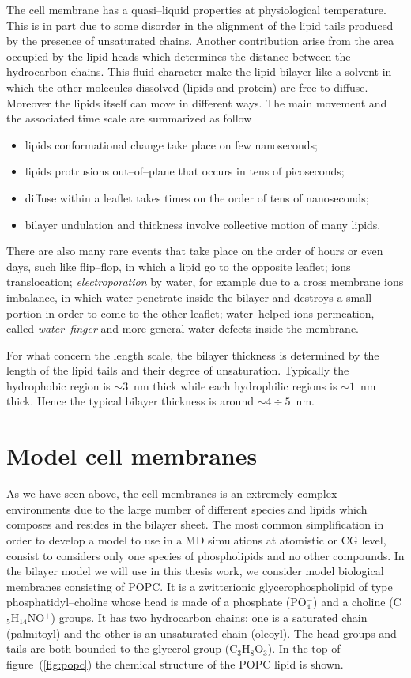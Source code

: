 The cell membrane has a quasi--liquid properties at physiological temperature. This is in part due to some disorder in the alignment of the lipid tails produced by the presence of unsaturated chains. Another contribution arise from the area occupied by the lipid heads which determines the distance between the hydrocarbon chains. This fluid character make the lipid bilayer like a solvent in which the other molecules dissolved (lipids and protein) are free to diffuse. Moreover the lipids itself can move in different ways. The main movement and the associated time scale are summarized as follow
\begin{itemize}
	\item lipids conformational change take place on few nanoseconds;
	\item lipids protrusions out--of--plane that occurs in tens of picoseconds;
	\item diffuse within a leaflet takes times on the order of tens of nanoseconds;
	\item bilayer undulation and thickness involve collective motion of many lipids.
\end{itemize}
There are also many rare events that take place on the order of hours or even days, such like flip--flop, in which a lipid go to the opposite leaflet; ions translocation; \textit{electroporation} by water, for example due to a cross membrane ions imbalance, in which water penetrate inside the bilayer and destroys a small portion in order to come to the other leaflet; water--helped ions permeation, called \textit{water--finger} and more general water defects inside the membrane.

For what concern the length scale, the bilayer thickness is determined by the length of the lipid tails and their degree of unsaturation. Typically the hydrophobic region is $\sim 3$~nm thick while each hydrophilic regions is $\sim 1$~nm thick. Hence the typical bilayer thickness is around $\sim 4\div 5$~nm.

\section{Model cell membranes}
As we have seen above, the cell membranes is an extremely complex environments due to the large number of different species and lipids which composes and resides in the bilayer sheet. The most common simplification in order to develop a model to use in a \ac{MD} simulations at atomistic or \ac{CG} level, consist to considers only one species of phospholipids and no other compounds. In the bilayer model we will use in this thesis work, we consider model biological membranes consisting of \ac{POPC}. It is a zwitterionic glycerophospholipid of type phosphatidyl--choline whose head is made of a phosphate (PO$_4^-$) and a choline (C$_5$H$_{14}$NO$^+$) groups. It has two hydrocarbon chains: one is a saturated chain (palmitoyl) and the other is an unsaturated chain (oleoyl). The head groups and tails are both bounded to the glycerol group (C$_3$H$_8$O$_3$). In the top of figure~(\ref{fig:popc}) the chemical structure of the \ac{POPC} lipid is shown.

